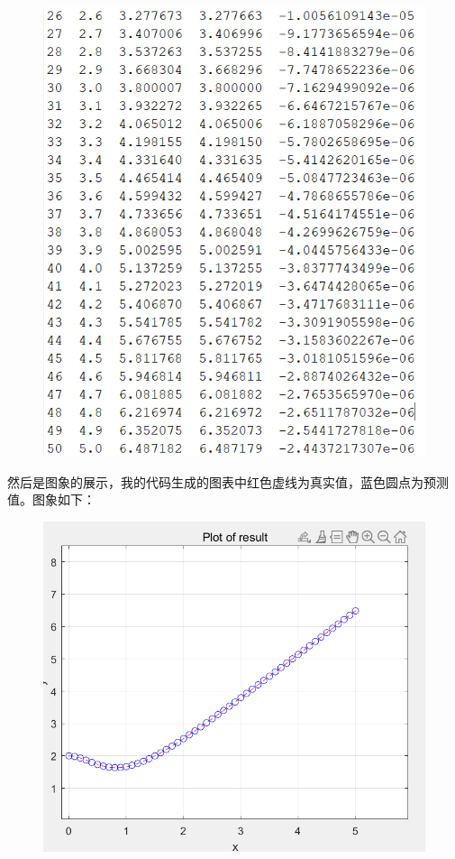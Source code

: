 \documentclass{LabReport}
\begin{document}
\begin{figure}[h!]
\begin{minipage}[t]{0.48\textwidth}
		\includegraphics[width=\linewidth]{figures/result_table2} %
		\label{fig:right_image} %
	\end{minipage}
\end{figure}

\hspace{0em}然后是图象的展示，我的代码生成的图表中红色虚线为真实值，蓝色圆点为预测值。图象如下：
\begin{figure}[h!]
	\centering
	\includegraphics[width=0.5\linewidth]{figures/result_img}
	\label{fig:resultimg}
\end{figure}
\end{document}
